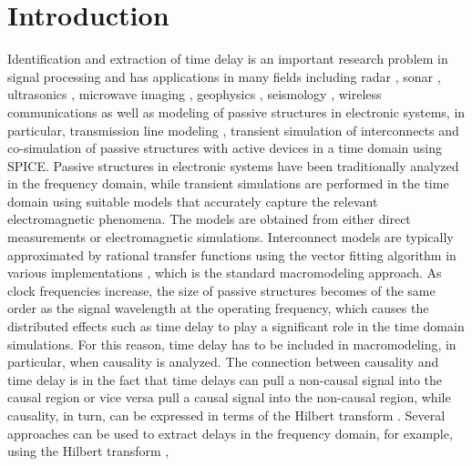 \documentclass[journal,twoside]{IEEEtran}
\begin{document}
\IEEEpeerreviewmaketitle

\section{Introduction}

Identification and extraction of time delay is an important research problem in signal processing and has applications in many fields including radar \cite{Li_2004}, sonar \cite{Quazi_1981, Chen_Benesty_Huang_2006}, ultrasonics \cite{De_Marchi_Marzani_Speciale_2009}, microwave imaging \cite{Lim_Nhung_Li_Thang_2008}, geophysics \cite{Kepko_Kivelson_1999}, seismology \cite{Wilcock_2004, Mercerat_Nolet_2013}, wireless communications \cite{Vanderveen_Vanderveen_Paulraj_1998} as well as  modeling of passive structures in electronic systems, in particular, transmission line modeling \cite{Gustavsen_2004, De_Tommasi_Gustavsen_2006},
transient simulation of interconnects \cite{Lalgudi_Engin_Casinovi_Swaminathan_2008} and co-simulation of passive structures with active devices in a time domain using SPICE. 
Passive structures in electronic systems have been traditionally analyzed in the frequency domain, while transient simulations are performed in the time domain using suitable  models that accurately capture  the relevant electromagnetic phenomena. The models are obtained from either direct measurements or electromagnetic simulations. Interconnect models are typically approximated by rational transfer functions using the vector fitting algorithm in various implementations \cite{Gustavsen_Semlyen_1999, Grivet_Talocia_2003, Gustavsen_Semlyen_2004, Deschrijver_Dhaene_2005, Grivet_Talocia_Bandinu_2006, Deschrijver_Haegeman_Dhaene_2007, Chinea_Triverio_Grivet_Talocia_2010}, which is the standard macromodeling approach.
As clock frequencies increase, the size of passive structures becomes of the same order as the signal wavelength at the operating frequency, which causes the distributed effects such as time delay to play a significant role in the time domain simulations. For this reason, time delay has to be included in  macromodeling, in particular, when causality is analyzed. The connection between causality and time delay is in the fact that time delays can pull a non-causal signal  into the causal region or vice versa pull a causal signal into the non-causal region, while causality, in turn, can be expressed in terms of the Hilbert transform \cite{Papoulis_1977, Weideman_1995, Nussenzveig_1972}. Several approaches can be used to extract delays in the frequency domain, for example, using the Hilbert transform \cite{Grennberg_Sandell_1994, Tsuchiya_Miki_2004, Knockaert_Dhaene_2008},
\end{document}
